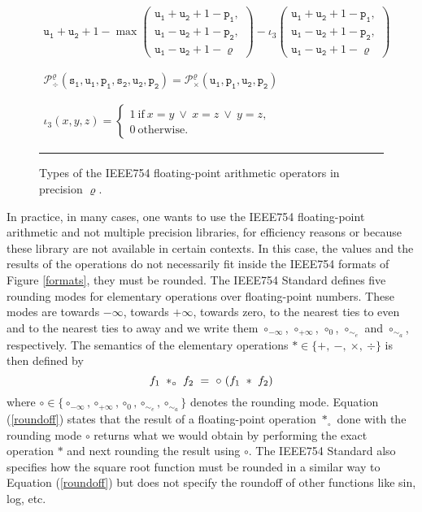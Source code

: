 \begin{figure}[tb]
$$\begin{array}{c}
\\
\mathtt{u_1}+\mathtt{u_2}+1-
\max\left(\begin{array}{c}
\mathtt{u_1}+\mathtt{u_2}+1-\mathtt{p_1},\\
\mathtt{u_1}-\mathtt{u_2}+1-\mathtt{p_2},\\
\mathtt{u_1}-\mathtt{u_2}+1-\varrho
\end{array}\right)
-\iota_3
\left(\begin{array}{c}
\mathtt{u_1}+\mathtt{u_2}+1-\mathtt{p_1},\\
\mathtt{u_1}-\mathtt{u_2}+1-\mathtt{p_2},\\
\mathtt{u_1}-\mathtt{u_2}+1-\varrho
\end{array}\right)
\\
\\
\\
\mathcal{P}_\div^\varrho(\mathtt{s_1},\mathtt{u_1},\mathtt{p_1},\mathtt{s_2},\mathtt{u_2},\mathtt{p_2})=
\mathcal{P}_\times^\varrho(\mathtt{u_1},\mathtt{p_1},\mathtt{u_2},\mathtt{p_2})\\
\\
\\
\iota_3(x,y,z)=\left\{\begin{array}{l}
1 \ \text{if}\ x=y\ \vee\ x=z\ \vee\ y=z,\\
0\ \text{otherwise}.
\end{array}\right.
\end{array}
$$
\hrule
\caption{\label{prim754}Types of the IEEE754 floating-point arithmetic operators in precision $\varrho$.} 
\end{figure}




In practice, in many cases, one wants to use the IEEE754 floating-point arithmetic and not
multiple precision libraries, for efficiency reasons or because these library are not available in
certain contexts. In this case, the values and the results of the operations do not
necessarily  fit inside the IEEE754 formats of Figure \ref{formats}, they must be rounded. 
The IEEE754 Standard defines five rounding modes for elementary operations over
floating-point numbers. These modes are towards $-\infty$, towards $+\infty$, towards zero,
 to the nearest ties to even and to the nearest ties to away and we write them $\circ_{-\infty}$, $\circ_{+\infty}$, $\circ_0$, 
$\circ_{\sim_e}$ and $\circ_{\sim_a}$, respectively.
The semantics of the elementary operations $\ast\in\{+,\ -,\ \times,\ \div\}$  is then defined by
\begin{equation}
\label{roundoff}\small
f_1\ \ast_{\circ}\ f_2\ =\ \circ\ (f_1\ \ast\ f_2) 
\end{equation}
%
where $\circ\in\{\circ_{-\infty},\circ_{+\infty},\circ_{0},\circ_{\sim_e},\circ_{\sim_a}\}$ denotes the rounding mode.
Equation (\ref{roundoff}) states that the result of a floating-point operation $\ast_\circ$ done
with the rounding mode $\circ$ returns what we would obtain by performing the exact operation $\ast$
and next rounding the result using $\circ$.
The IEEE754 Standard also specifies how the square root function must be rounded in a similar way
to Equation (\ref{roundoff}) but does not specify
the roundoff of other functions like sin, log, etc.


